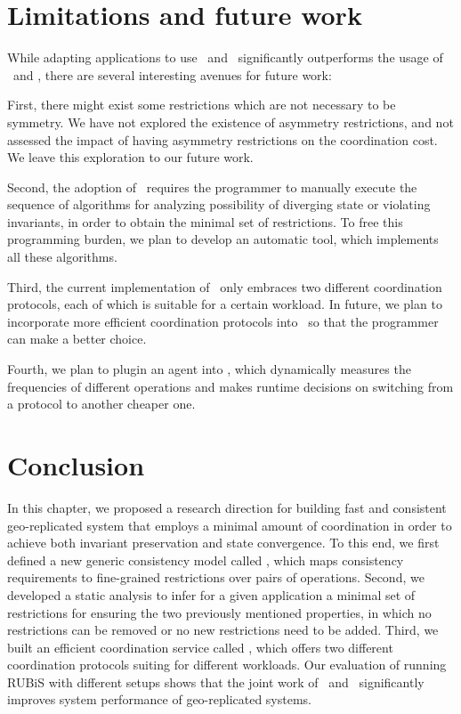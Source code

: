 \section{Limitations and future work}
\label{ch:por:sect:limit}

While adapting applications to use \PRCN\ and \coordtool\ significantly outperforms
the usage of \RBCN\ and \tool, there are several interesting avenues for future work:

First, there might exist some restrictions which are not necessary to be symmetry. We have not
explored the existence of asymmetry restrictions, and not assessed the impact of having asymmetry
restrictions on the coordination cost. We leave this exploration to our future work.

Second, the adoption of \PRCN\ requires the programmer to manually execute the sequence
of algorithms for analyzing possibility of diverging state or violating invariants, in order to
obtain the minimal set of restrictions. To free this programming burden, we plan to develop
an automatic tool, which implements all these algorithms.

Third, the current implementation of \coordtool\ only embraces two different coordination
protocols, each of which is suitable for a certain workload. In future, we plan to incorporate
more efficient coordination protocols into \coordtool\ so that the programmer can make a better
choice.

Fourth, we plan to plugin an agent into \coordtool, which dynamically measures
the frequencies of different operations and makes runtime decisions on switching from
a protocol to another cheaper one.

\section{Conclusion}
\label{ch:por:sect:conclude}
In this chapter, we proposed a research direction for building fast and consistent
geo-replicated system that employs a minimal amount of coordination in
order to achieve both invariant preservation and state convergence. 
To this end, we first defined a new generic consistency model called \PRCN, which maps
consistency requirements to fine-grained restrictions over pairs of operations. Second,
we developed a static analysis to infer for a given application
a minimal set of restrictions for ensuring the two previously mentioned properties, in which
no restrictions can be removed or no new restrictions need to be added. Third, we built an efficient
coordination service called \coordtool, which offers two different coordination protocols
suiting for different workloads. Our evaluation of running RUBiS with different
setups shows that the joint work of \PRCN\ and \coordtool\ significantly
improves system performance of geo-replicated systems.
